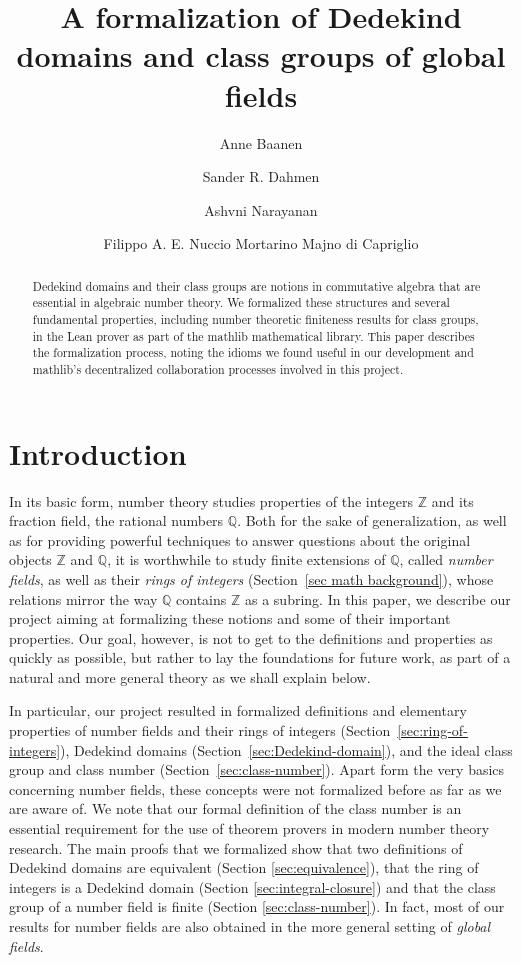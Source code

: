 \documentclass[a4paper,USenglish,cleveref, autoref, thm-restate]{lipics-v2021}
\title{A formalization of Dedekind domains and class groups of global fields}
\author{Anne Baanen}{Department of Computer Science, Vrije Universiteit Amsterdam, The Netherlands \and \url{https://cs.vu.nl/~tbn305}}{t.baanen@vu.nl}{https://orcid.org/0000-0001-8497-3683}
{NWO Vidi grant No.\ 016.Vidi.189.037, Lean Forward}
\author{Sander R. Dahmen}{Department of Mathematics, Vrije Universiteit Amsterdam, The Netherlands \and \url{https://few.vu.nl/~sdn249/}}{s.r.dahmen@vu.nl}{https://orcid.org/0000-0002-0014-0789}{NWO Vidi grant No.\ 639.032.613, New Diophantine Directions}
\author{Ashvni Narayanan}{London School of Geometry and Number Theory}{a.narayanan20@imperial.ac.uk}{https://orcid.org/0000-0003-2777-4228}{EPSRC Grant EP/S021590/1 (UK)}
\author{Filippo A. E. Nuccio Mortarino Majno di Capriglio}{Univ Lyon, Université Jean Monnet Saint-Étienne, CNRS UMR 5208, Institut Camille Jordan, F-42023 Saint-\'Etienne, France\and\url {https://perso.univ-st-etienne.fr/nf51454h/index.html}}{filippo.nuccio@univ-st-etienne.fr}{https://orcid.org/0000-0002-5318-9869}{\empty}
\newcommand{\mathlib}{\textsf{mathlib}\xspace}
\newcommand{\Q}{\mathbb{Q}}
\newcommand{\Z}{\mathbb{Z}}
\begin{document}
\maketitle

\begin{abstract}
Dedekind domains and their class groups are notions in commutative algebra that are essential in algebraic number theory.
We formalized these structures and several fundamental properties, including number theoretic finiteness results for class groups, in the Lean prover as part of the \mathlib mathematical library.
This paper describes the formalization process, noting the idioms we found useful in our development and \mathlib's decentralized collaboration processes involved in this project.
\end{abstract}

\section{Introduction}

In its basic form, number theory studies properties of the integers $\Z$
and its fraction field, the rational numbers $\Q$.
Both for the sake of generalization, as well as for providing powerful techniques to answer questions about the original objects $\Z$ and $\Q$,
it is worthwhile to study finite extensions of $\Q$, called \emph{number fields}, as well as their \emph{rings of integers} (Section~\ref{sec math background}),
whose relations mirror the way $\Q$ contains $\Z$ as a subring.
In this paper, we describe our project aiming at formalizing these notions and some of their important properties. Our goal, however, is not to get to the definitions and properties as quickly as possible,
but rather
to lay the foundations for future work,
as part of a natural and more general theory as we shall explain below.

In particular, our project resulted in formalized definitions and elementary properties of
number fields and their rings of integers (Section~\ref{sec:ring-of-integers}),
Dedekind domains (Section~\ref{sec:Dedekind-domain}),
and the ideal class group and class number (Section~\ref{sec:class-number}).
Apart form the very basics concerning number fields, these concepts were not formalized before as far as we are aware of.
We note that our formal definition of the class number is an essential requirement for the use of theorem provers in modern number theory research.
The main proofs that we formalized show
that two definitions of Dedekind domains are equivalent (Section \ref{sec:equivalence}),
that the ring of integers
is a Dedekind domain (Section \ref{sec:integral-closure})
and that the class group of a number field is finite (Section \ref{sec:class-number}).
In fact, most of our results for number fields are also obtained in the more general setting of \emph{global fields}.
\end{document}
